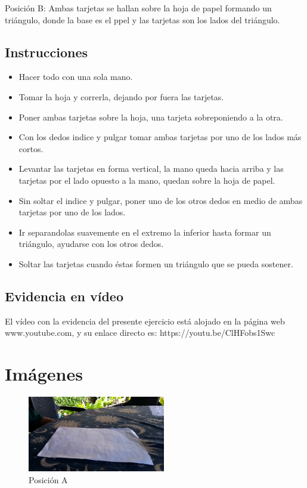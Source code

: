 \documentclass{article}
\begin{document}
\vspace{0.8cm}

Posición B: Ambas tarjetas se hallan sobre la hoja de papel formando un triángulo, donde la base es el ppel y las tarjetas son los lados del triángulo.

\subsection{Instrucciones}

\vspace{0.2cm}

\begin{itemize}
\item Hacer todo con una sola mano.
\item Tomar la hoja y correrla, dejando por fuera las tarjetas.
\item Poner ambas tarjetas sobre la hoja, una tarjeta sobreponiendo a la otra.
\item Con los dedos indice y pulgar tomar ambas tarjetas por uno de los lados más cortos.
\item Levantar las tarjetas en forma vertical, la mano queda hacia arriba y las tarjetas por el lado opuesto a la mano, quedan sobre la hoja de papel.
\item Sin soltar el indice y pulgar, poner uno de los otros dedos en medio de ambas tarjetas por uno de los lados.
\item Ir separandolas suavemente en el extremo la inferior hasta formar un triángulo, ayudarse con los otros dedos.
\item Soltar las tarjetas cuando éstas formen un triángulo que se pueda sostener.
\end{itemize}
\subsection{Evidencia en vídeo}
El vídeo con la evidencia del presente ejercicio está alojado en la página web www.youtube.com, y su enlace directo es:
https://youtu.be/ClHFobs1Swc

\newpage


\section{Imágenes} \label{imagenes}


\begin{figure}[h]
\includegraphics[width=6cm]{pos_a.png}
\centering
\caption{Posición A}
\label{fig:pos_a}
\end{figure}
\end{document}
